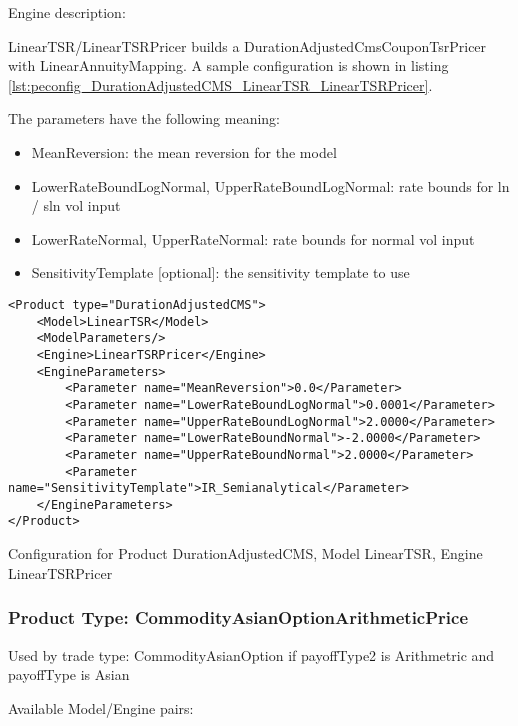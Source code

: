 Engine description:

LinearTSR/LinearTSRPricer builds a DurationAdjustedCmsCouponTsrPricer with LinearAnnuityMapping. A sample configuration
is shown in listing \ref{lst:peconfig_DurationAdjustedCMS_LinearTSR_LinearTSRPricer}.

The parameters have the following meaning:

\begin{itemize}
\item MeanReversion: the mean reversion for the model
\item LowerRateBoundLogNormal, UpperRateBoundLogNormal: rate bounds for ln / sln vol input
\item LowerRateNormal, UpperRateNormal: rate bounds for normal vol input
\item SensitivityTemplate [optional]: the sensitivity template to use 
\end{itemize}

\begin{longlisting}
\begin{verbatim}
<Product type="DurationAdjustedCMS">
    <Model>LinearTSR</Model>
    <ModelParameters/>
    <Engine>LinearTSRPricer</Engine>
    <EngineParameters>
        <Parameter name="MeanReversion">0.0</Parameter>
        <Parameter name="LowerRateBoundLogNormal">0.0001</Parameter>
        <Parameter name="UpperRateBoundLogNormal">2.0000</Parameter>
        <Parameter name="LowerRateBoundNormal">-2.0000</Parameter>
        <Parameter name="UpperRateBoundNormal">2.0000</Parameter>
        <Parameter name="SensitivityTemplate">IR_Semianalytical</Parameter>
    </EngineParameters>
</Product>
\end{verbatim}
\caption{Configuration for Product DurationAdjustedCMS, Model LinearTSR, Engine LinearTSRPricer}
\label{lst:peconfig_DurationAdjustedCMS_LinearTSR_LinearTSRPricer}
\end{longlisting}

\subsubsection{Product Type: CommodityAsianOptionArithmeticPrice}

Used by trade type: CommodityAsianOption if payoffType2 is Arithmetric and payoffType is Asian

Available Model/Engine pairs:

